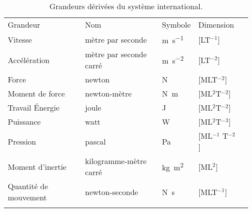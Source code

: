 \begin{table}[!h]
\centering
\begin{tabular*}{15cm}{M{5.5cm}M{4cm}M{1.5cm}M{2cm}N}
\hhline{====}
Grandeur & Nom & Symbole & Dimension \\
\hhline{----}
Vitesse          & mètre par seconde & \si{\meter\per\second}&[LT$^{-1}$]     \\
Accélération     & mètre par 
                    seconde carré    & \si{\meter\per
                                            \second\squared} &[LT$^{-2}$]     \\
Force            & newton            & \si{\newton}          &[MLT$^{-2}$]    \\
Moment de force  & newton-mètre      & \si{\newton\meter}    &[ML$^2$T$^{-2}$]\\
Travail \'Energie& joule             & \si{\joule}           &[ML$^2$T$^{-2}$]\\
Puissance        & watt              & \si{\watt}            &[ML$^2$T$^{-3}$]\\
Pression         & pascal            & \si{\pascal}          &[ML$^{-1}$
                                                                  T$^{-2}$]   \\
Moment d'inertie & kilogramme-mètre 
                    carré            & \si{\kilogram
                                            \meter\squared}   &[ML$^2$]       \\
Quantité 
de mouvement     & newton-seconde    & \si{\newton\second}   &[MLT$^{-1}$]    \\
\hhline{====}
\end{tabular*}
\caption{Grandeurs dérivées du système international.}
\end{table}


